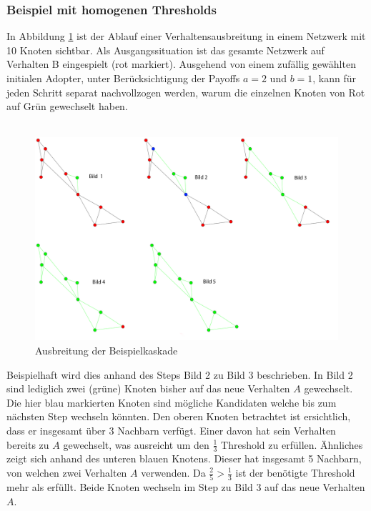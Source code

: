 \documentclass[12pt]{article}
\begin{document}
\subsubsection{Beispiel mit homogenen Thresholds}
\label{sss_beispielHomo}
In Abbildung \ref{pic_cascade} ist der Ablauf einer Verhaltensausbreitung in einem Netzwerk mit 10 Knoten sichtbar. Als Ausgangssituation ist das gesamte Netzwerk auf Verhalten B eingespielt (rot markiert). Ausgehend von einem zufällig gewählten initialen Adopter, unter Berücksichtigung der Payoffs $a=2$ und $b=1$, kann für jeden Schritt separat nachvollzogen werden, warum die einzelnen Knoten von Rot auf Grün gewechselt haben.\\\\
\begin{figure}
  \begin{center}
    \includegraphics[scale=0.2]{pic_cascade.png}
  \end{center}
  \caption{Ausbreitung der Beispielkaskade}
  \label{pic_cascade}
\end{figure}Beispielhaft wird dies anhand des Steps Bild 2 zu Bild 3 beschrieben. In Bild 2 sind lediglich zwei (grüne) Knoten bisher auf das neue Verhalten $A$ gewechselt. Die hier blau markierten Knoten sind mögliche Kandidaten welche bis zum nächsten Step wechseln könnten. Den oberen Knoten betrachtet ist ersichtlich, dass er insgesamt über 3 Nachbarn verfügt. Einer davon hat sein Verhalten bereits zu $A$ gewechselt, was ausreicht um den $\frac{1}{3}$ Threshold zu erfüllen. Ähnliches zeigt sich anhand des unteren blauen Knotens. Dieser hat insgesamt 5 Nachbarn, von welchen zwei Verhalten $A$ verwenden. Da $\frac{2}{5} > \frac{1}{3}$ ist der benötigte Threshold mehr als erfüllt. Beide Knoten wechseln im Step zu Bild 3 auf das neue Verhalten $A$.
\end{document}
